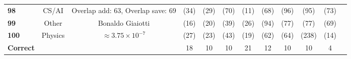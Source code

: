 \begin{table*}[htb]
\begin{center}
\begin{tiny}
\begin{tabular}{l|c|c|ccccccccc}
\textbf{98} & CS/AI & Overlap add: 63, Overlap save: 69  & \X (34) & \X (29) & \X (70) & \X (11) & \X (68) & \X (96) & \X (95) & \X (73)\\
\textbf{99} & Other & Bonaldo Giaiotti  & \X (16) & \X (20) & \X (39) & \X (26) & \X (94) & \X (77) & \X (77) & \X (69)\\
\textbf{100} & Physics & $\approx 3.75 \times 10^{-7}$  & \X (27) & \X (23) & \X (43) & \X (19) & \X (62) & \X (64) & \X (238) & \X (14)\\
\midrule
\textbf{Correct} &  &  & 18 & 10 & 10 & 21 & 12 & 10 & 10 & 4 \\
\bottomrule
\end{tabular}
\end{tiny}
\end{center}
\vspace{-10pt}
\end{table*}

